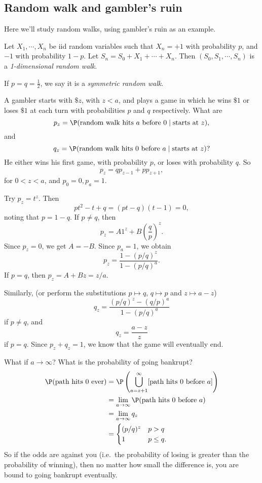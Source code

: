 \documentclass[a4paper]{article}
\begin{document}
\subsection{Random walk and gambler's ruin}
Here we'll study random walks, using gambler's ruin as an example.

\begin{defi}
  Let $X_1, \cdots, X_n$ be iid random variables such that $X_n = +1$ with probability $p$, and $-1$ with probability $1 - p$. Let $S_n = S_0 + X_1 + \cdots + X_n$. Then $(S_0, S_1, \cdots, S_n)$ is a \emph{1-dimensional random walk}.

  If $p = q = \frac{1}{2}$, we say it is a \emph{symmetric random walk}.
\end{defi}

\begin{eg}
  A gambler starts with $\$z$, with $z < a$, and plays a game in which he wins $\$1$ or loses $\$ 1$ at each turn with probabilities $p$ and $q$ respectively. What are
  \[
    p_z = \P(\text{random walk hits $a$ before } 0 \mid \text{starts at } z),
  \]
  and
  \[
    q_z = \P(\text{random walk hits 0 before }a \mid \text{starts at }z)?
  \]
  He either wins his first game, with probability $p$, or loses with probability $q$. So
  \[
    p_z = qp_{z - 1} + pp_{z + 1},
  \]
  for $0 < z < a$, and $p_0 = 0, p_a = 1$.

  Try $p_z = t^z$. Then
  \[
    pt^2 - t + q = (pt - q)(t - 1) = 0,
  \]
  noting that $p = 1 - q$. If $p \not = q$, then
  \[
    p_z = A1^z + B\left(\frac{q}{p}\right)^z.
  \]
  Since $p_z = 0$, we get $A = -B$. Since $p_a = 1$, we obtain
  \[
    p_z = \frac{1 - (p/q)^z}{1 - (p/q)^a}.
  \]
  If $p = q$, then $p_z = A + Bz = z/a$.

  Similarly, (or perform the substitutions $p\mapsto q$, $q\mapsto p$ and $z \mapsto a - z$)
  \[
    q_z = \frac{(p/q)^z - (q/p)^a}{1 - (p/q)^a}
  \]
  if $p\not = q$, and
  \[
    q_z = \frac{a - z}{z}
  \]
  if $p = q$. Since $p_z + q_z = 1$, we know that the game will eventually end.

  What if $a\to \infty$? What is the probability of going bankrupt?
  \begin{align*}
    \P(\text{path hits 0 ever}) &= \P\left(\bigcup_{a = z+1}^\infty [\text{path hits 0 before }a]\right)\\
    &= \lim_{a\to \infty}\P(\text{path hits 0 before }a)\\
    &= \lim_{a\to \infty}q_z\\
    &= \begin{cases}
      (p/q)^z & p > q\\
      1 & p \leq q.
    \end{cases}
  \end{align*}
  So if the odds are against you (i.e.\ the probability of losing is greater than the probability of winning), then no matter how small the difference is, you are bound to going bankrupt eventually.
\end{eg}
\end{document}
